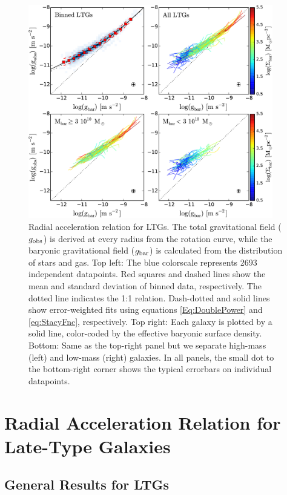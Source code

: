 \documentclass[apjl, twocolappendix]{emulateapj}
\begin{document}
\begin{figure}[thb]
\centering
\includegraphics[width=0.95\textwidth]{RAR_LTG.pdf}
\caption{Radial acceleration relation for LTGs. The total gravitational field ($g_{\rm obs}$) is derived at every radius from the rotation curve, while the baryonic gravitational field ($g_{\rm bar}$) is calculated from the distribution of stars and gas. Top left: The blue colorscale represents 2693 independent datapoints. Red squares and dashed lines show the mean and standard deviation of binned data, respectively. The dotted line indicates the 1:1 relation. Dash-dotted and solid lines show error-weighted fits using equations \ref{Eq:DoublePower} and \ref{eq:StacyFnc}, respectively. Top right: Each galaxy is plotted by a solid line, color-coded by the effective baryonic surface density. Bottom: Same as the top-right panel but we separate high-mass (left) and low-mass (right) galaxies. In all panels, the small dot to the bottom-right corner shows the typical errorbars on individual datapoints.}
\label{fig:RFR}
\end{figure}
\section{Radial Acceleration Relation for Late-Type Galaxies}\label{sec:LTGs}

\subsection{General Results for LTGs}\label{sec:DiskRes}
\end{document}

